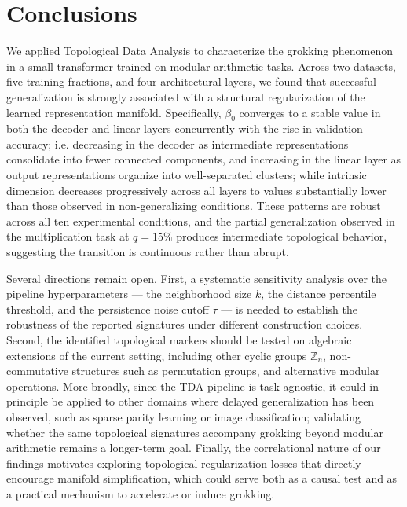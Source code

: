 \section{Conclusions}
\label{sec:conclusion}

We applied Topological Data Analysis to characterize the grokking phenomenon in a small transformer trained on modular arithmetic tasks. Across two datasets, five training fractions, and four architectural layers, we found that successful generalization is strongly associated with a structural regularization of the learned representation manifold. Specifically, $\beta_0$ converges to a stable value in both the decoder and linear layers concurrently with the rise in validation accuracy; i.e. decreasing in the decoder as intermediate representations consolidate into fewer connected components, and increasing in the linear layer as output representations organize into well-separated clusters; while intrinsic dimension decreases progressively across all layers to values substantially lower than those observed in non-generalizing conditions. These patterns are robust across all ten experimental conditions, and the partial generalization observed in the multiplication task at $q = 15\%$ produces intermediate topological behavior, suggesting the transition is continuous rather than abrupt.

Several directions remain open. First, a systematic sensitivity analysis over the pipeline hyperparameters --- the neighborhood size $k$, the distance percentile threshold, and the persistence noise cutoff $\tau$ --- is needed to establish the robustness of the reported signatures under different construction choices. Second, the identified topological markers should be tested on algebraic extensions of the current setting, including other cyclic groups $\mathbb{Z}_n$, non-commutative structures such as permutation groups, and alternative modular operations. More broadly, since the TDA pipeline is task-agnostic, it could in principle be applied to other domains where delayed generalization has been observed, such as sparse parity learning or image classification; validating whether the same topological signatures accompany grokking beyond modular arithmetic remains a longer-term goal. Finally, the correlational nature of our findings motivates exploring topological regularization losses that directly encourage manifold simplification, which could serve both as a causal test and as a practical mechanism to accelerate or induce grokking. 